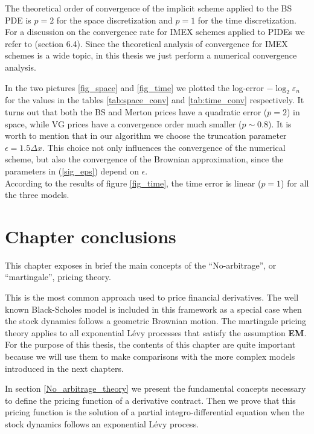 The theoretical order of convergence of the implicit scheme applied to the BS PDE is $p=2$ for the space discretization and $p=1$ for the time discretization.
For a discussion on the convergence rate for IMEX schemes applied to PIDEs we refer to \cite{CoVo05b} (section 6.4). 
Since the theoretical analysis of convergence for IMEX schemes is a wide topic, in this thesis we just perform a numerical convergence analysis.

In the two pictures \ref{fig_space} and \ref{fig_time} we plotted the log-error $- \log_2 \varepsilon_n$ for the values 
in the tables \ref{tab:space_conv} and \ref{tab:time_conv} respectively.
It turns out that both the BS and Merton prices have a quadratic error ($p=2$) in space, while VG prices have a convergence order much smaller ($p\sim 0.8$). 
It is worth to mention that in our algorithm we choose the truncation parameter $\epsilon = 1.5 \Delta x$.
This choice not only influences the convergence of the numerical scheme, but also the convergence of the Brownian approximation, since the parameters in (\ref{sig_eps}) depend on 
$\epsilon$.\\
According to the results of figure \ref{fig_time}, the time error is linear ($p=1$) for all the three models.



\section{Chapter conclusions}


This chapter exposes in brief  
the main concepts of the ``No-arbitrage'', or ``martingale'', pricing theory. 

This is the most common approach used to price financial derivatives. 
The well known Black-Scholes model is included in this framework as a special case when the stock dynamics follows
a geometric Brownian motion. 
The martingale pricing theory applies to all exponential Lévy processes that satisfy the assumption \textbf{EM}.
For the purpose of this thesis, the contents of this chapter are quite important because we will use them to make comparisons 
with the more complex models introduced in the next chapters.

In section \ref{No_arbitrage_theory} we present the fundamental concepts necessary to define the pricing function of a derivative contract.
Then we prove that this pricing function is the solution of a partial integro-differential equation when the stock dynamics follows an exponential Lévy process.

